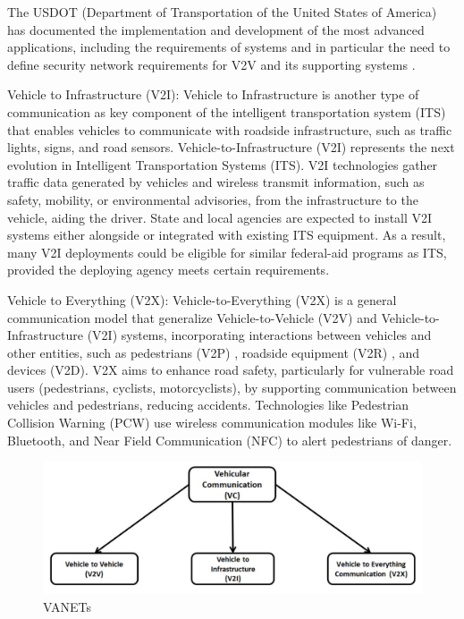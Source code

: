 The USDOT (Department of Transportation of the United States of America) has documented the
implementation and development of the most advanced applications, including the requirements of
systems and in particular the need to define security network requirements for V2V and its supporting systems \cite{dot2021v2v} .



Vehicle to Infrastructure (V2I):
Vehicle to Infrastructure is another type of communication as key component of the intelligent transportation system (ITS) that enables vehicles to communicate with roadside infrastructure, such as traffic lights, signs, and road sensors.
Vehicle-to-Infrastructure (V2I) represents the next evolution in Intelligent Transportation Systems (ITS). V2I technologies gather traffic data generated by vehicles and wireless transmit information, such as safety, mobility, or environmental advisories, from the infrastructure to the vehicle, aiding the driver.
State and local agencies are expected to install V2I systems either alongside or integrated with existing ITS equipment.
As a result, many V2I deployments could be eligible for similar federal-aid programs as ITS, provided the deploying agency meets certain requirements.
\cite{dot2024v2i}

Vehicle to Everything (V2X):
Vehicle-to-Everything (V2X) is a general communication model that generalize Vehicle-to-Vehicle (V2V) and Vehicle-to-Infrastructure (V2I) systems, incorporating interactions between vehicles and other entities, such as pedestrians (V2P) \cite{vehicle-to-pedestrian}, roadside equipment (V2R) \cite{vehicle-to-roadside}, and devices (V2D).
V2X aims to enhance road safety, particularly for vulnerable road users (pedestrians, cyclists, motorcyclists), by supporting communication between vehicles and pedestrians, reducing accidents.
Technologies like Pedestrian Collision Warning (PCW) use wireless communication modules like Wi-Fi, Bluetooth, and Near Field Communication (NFC) to alert pedestrians of danger.

\begin{figure}[!htb]
    \centering
    \includegraphics[width=0.7\linewidth]{figures/communication}
    \caption{VANETs}
    \label{fig:communication}
\end{figure}


